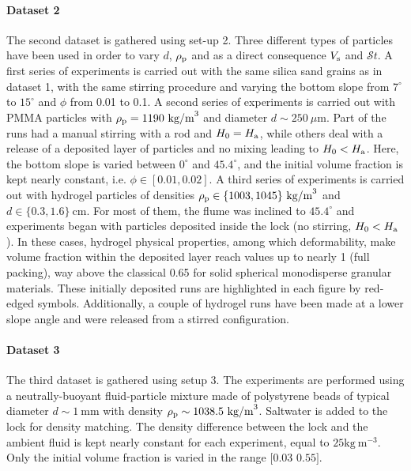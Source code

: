 \documentclass[12pt]{article}
\begin{document}
\paragraph{Dataset 2}

The second dataset is gathered using set-up 2. Three different types of particles have been used in order to vary $d$, $\rho_{\text p}$ and as a direct consequence $V_{\text s}$ and $\mathcal{S}t$. A first series of experiments is carried out with the same silica sand grains as in dataset 1, with the same stirring procedure and varying the bottom slope from $7^\circ$ to $15^\circ$ and $\phi$ from 0.01 to 0.1.
%
A second series of experiments is carried out with PMMA particles with $\rho_{\text p}=1190~\textrm{kg/m}^{3}$ and diameter $d\sim 250~\mu\textrm{m}$. Part of the runs had a manual stirring with a rod and $H_0=H_{\text a}$, while others deal with a release of a deposited layer of particles and no mixing leading to $H_0<H_{\text a}$. Here, the bottom slope is varied between $0^\circ$ and $45.4^\circ$, and the initial volume fraction is kept nearly constant, i.e. $\phi \in [0.01, 0.02]$.
%
A third series of experiments is carried out with hydrogel particles of densities $\rho_{\text p}\in \{1003, 1045\}~\textrm{kg/m}^{3}$ and $d\in \{0.3, 1.6\}~\textrm{cm}$. For most of them, the flume was inclined to $45.4^\circ$ and experiments began with particles deposited inside the lock (no stirring, $H_0<H_{\text a}$). In these cases, hydrogel physical properties, among which deformability, make volume fraction within the deposited layer reach values up to nearly 1 (full packing), way above the classical 0.65 for solid spherical monodisperse granular materials. These initially deposited runs are highlighted in each figure by red-edged symbols. Additionally, a couple of hydrogel runs have been made at a lower slope angle and were released from a stirred configuration.

\paragraph{Dataset 3}

The third dataset is gathered using setup 3. The experiments are performed using a neutrally-buoyant fluid-particle mixture made of polystyrene beads of typical diameter $d \sim 1~\textrm{mm}$ with density $\rho_{\text p} \sim 1038.5~\textrm{kg/m}^{3}$. Saltwater is added to the lock for density matching. The density difference between the lock and the ambient fluid is kept nearly constant for each experiment, equal to $25 \textrm{kg}~\textrm{m}^{-3}$. Only the initial volume fraction is varied in the range $[0.03$  $0.55]$.
\end{document}
